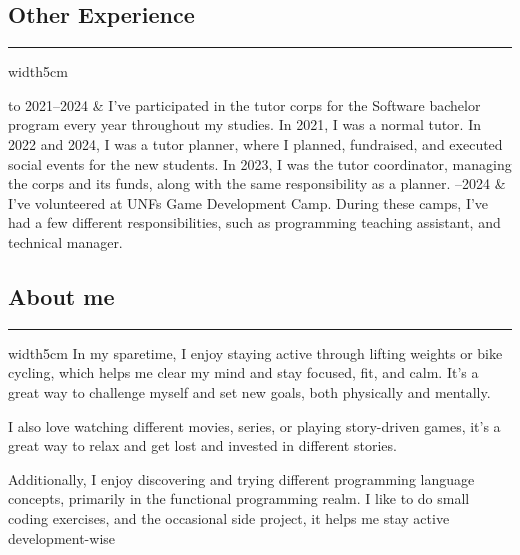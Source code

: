 \documentclass[a4paper]{report}
\def\secsep{\hrule width5cm}
\begin{document}
\subsection*{Other Experience}
\secsep
\vspace{-1em}
\begin{longtabu} to 
2021--2024 & 
    I've participated in the tutor corps for the Software bachelor program every year throughout my studies.
    In 2021, I was a normal tutor.
    In 2022 and 2024, I was a tutor planner, where I planned, fundraised, and executed social events for the new students.
    In 2023, I was the tutor coordinator, managing the corps and its funds, along with the same responsibility as a planner.
--2024 & 
    I've volunteered at UNFs Game Development Camp.
    During these camps, I've had a few different responsibilities, such as programming teaching assistant, and technical manager.
\end{longtabu}

\subsection*{About me}
\secsep
\vspace{-0.0em}
\setlength{\parskip}{1ex}
In my sparetime, I enjoy staying active through lifting weights or bike cycling, which helps me clear my mind and stay focused, fit, and calm.
It’s a great way to challenge myself and set new goals, both physically and mentally.\par

\noindent
I also love watching different movies, series, or playing story-driven games, it’s a great way to relax and get lost and invested in different stories.

\noindent
Additionally, I enjoy discovering and trying different programming language concepts, primarily in the functional programming realm.
I like to do small coding exercises, and the occasional side project, it helps me stay active development-wise
\end{document}
